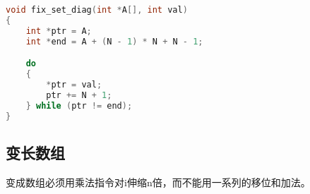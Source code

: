 {{        %
        \begin{practicec}

        \end{practicec}

        \begin{practicec}
            \begin{lstlisting}[language=C]
void fix_set_diag(int *A[], int val)
{
    int *ptr = A;
    int *end = A + (N - 1) * N + N - 1;

    do
    {
        *ptr = val;
        ptr += N + 1;
    } while (ptr != end);
}
            \end{lstlisting}
        \end{practicec}
    }

    \subsection{变长数组}
    {
        变成数组必须用乘法指令对i伸缩n倍，而不能用一系列的移位和加法。
    }
}
